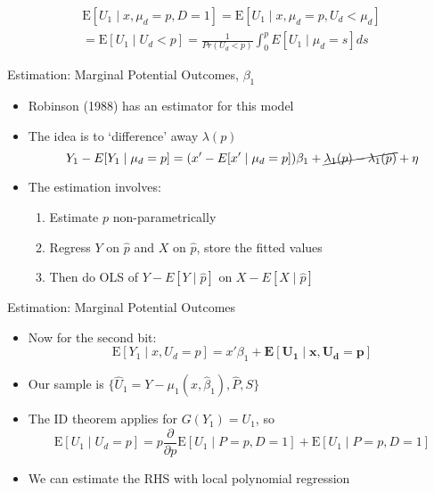 \documentclass{beamer}
\begin{document}
\begin{frame}
  \begin{align*}
  \mathrm{E}[U_1\mid x,\mu_d=p,
  D=1   ] = \mathrm{E}[U_1\mid x, \mu_d=p, U_d < \mu_d    ] \\ = \mathrm{E}[U_1\mid  U_d < p    ] = \frac{1}{Pr(U_d<p)} \int_0^pE[U_1\mid \mu_d=s] ds
\end{align*}
\end{frame}

\begin{frame}{Estimation:  Marginal Potential Outcomes, $\beta_1$}
  \begin{itemize}
  \item Robinson (1988) has an estimator for this model
\item The idea is to
  `difference' away $\lambda(p)$
  \begin{equation*}
Y_1 - E[Y_1\mid \mu_d=p] = (x'-E[x'\mid \mu_d=p])\beta_1 +  \cancel{\lambda_1(p) - \lambda_1(p)} + \eta
\end{equation*}
\item The estimation involves:
\begin{enumerate}
\item Estimate ${p}$ non-parametrically
\item Regress $Y$ on $\hat{p}$ and $X$ on $\hat{p}$, store the fitted values
\item Then do OLS of $Y - E[Y\mid \hat{p}]$ on $X -
   E[X\mid \hat{p}]$
\end{enumerate}
  \end{itemize}

\end{frame}

\begin{frame}{Estimation:  Marginal Potential Outcomes }
  \begin{itemize}
  \item Now for the second bit: \begin{equation*}
      \mathrm{E}[Y_1\mid x,U_d=p]  = x'\beta_1 +  \mathbf{\mathrm{\mathbf{E}}[U_1\mid x,U_d=p]}
    \end{equation*}
\item Our sample is $\{\hat{U}_1= Y-\mu_1(x,\hat{\beta}_1), \hat{P},
  S\}$
\item The ID theorem applies for $G(Y_1)=U_1$, so
\begin{equation*}
  \mathrm{E}[U_1\mid U_d= p] = p \frac{\partial}{\partial
    p}\mathrm{E}[U_1\mid P=p,D=1] + \mathrm{E}[U_1\mid P=p,D=1]
\end{equation*}
\item We can estimate the RHS with local polynomial regression
  \end{itemize}

\end{frame}
\end{document}
